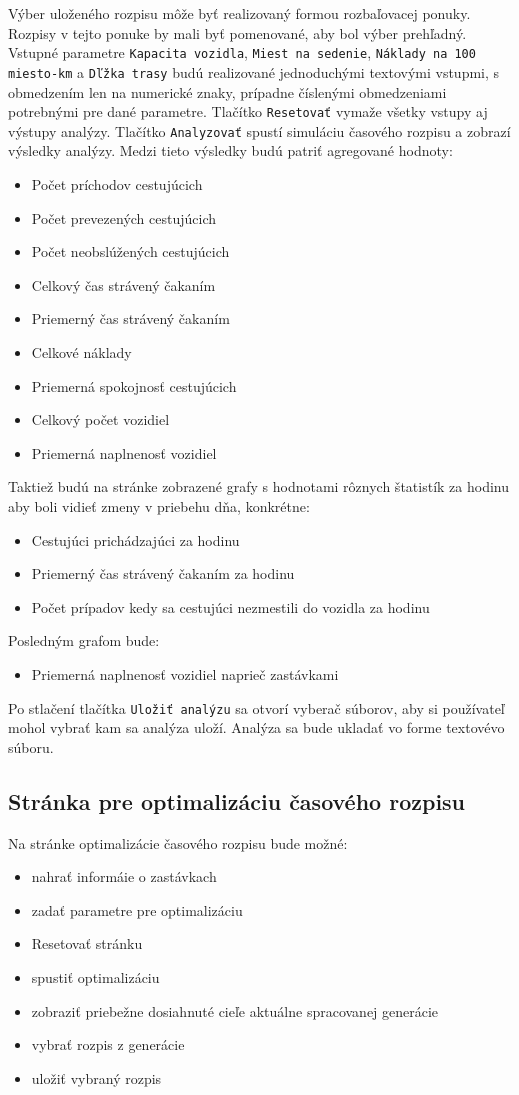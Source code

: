 Výber uloženého rozpisu môže byť realizovaný formou rozbaľovacej ponuky.
Rozpisy v tejto ponuke by mali byť pomenované, aby bol výber prehľadný.
Vstupné parametre \texttt{Kapacita vozidla}, \texttt{Miest na sedenie}, \texttt{Náklady na 100 miesto-km} a \texttt{Dľžka trasy} budú realizované jednoduchými textovými vstupmi, s obmedzením len na numerické znaky, prípadne číslenými obmedzeniami potrebnými pre dané parametre.
Tlačítko \texttt{Resetovať} vymaže všetky vstupy aj výstupy analýzy.
Tlačítko \texttt{Analyzovať} spustí simuláciu časového rozpisu a zobrazí výsledky analýzy.
Medzi tieto výsledky budú patriť agregované hodnoty:
\begin{itemize}
  \item Počet príchodov cestujúcich
  \item Počet prevezených cestujúcich
  \item Počet neobslúžených cestujúcich
  \item Celkový čas strávený čakaním
  \item Priemerný čas strávený čakaním
  \item Celkové náklady
  \item Priemerná spokojnosť cestujúcich
  \item Celkový počet vozidiel
  \item Priemerná naplnenosť vozidiel
\end{itemize}
Taktiež budú na stránke zobrazené grafy s hodnotami rôznych štatistík za hodinu aby boli vidieť zmeny v priebehu dňa, konkrétne:
\begin{itemize}
  \item Cestujúci prichádzajúci za hodinu
  \item Priemerný čas strávený čakaním za hodinu
  \item Počet prípadov kedy sa cestujúci nezmestili do vozidla za hodinu
\end{itemize}
Posledným grafom bude:
\begin{itemize}
  \item Priemerná naplnenosť vozidiel naprieč zastávkami
\end{itemize}
Po stlačení tlačítka \texttt{Uložiť analýzu} sa otvorí vyberač súborov, aby si používateľ mohol vybrať kam sa analýza uloží.
Analýza sa bude ukladať vo forme textovévo súboru.

\newpage
\subsection*{Stránka pre optimalizáciu časového rozpisu}
Na stránke optimalizácie časového rozpisu bude možné:
\begin{itemize}
  \item nahrať informáie o zastávkach
  \item zadať parametre pre optimalizáciu
  \item Resetovať stránku
  \item spustiť optimalizáciu
  \item zobraziť priebežne dosiahnuté cieľe aktuálne spracovanej generácie
  \item vybrať rozpis z generácie
  \item uložiť vybraný rozpis
\end{itemize}

